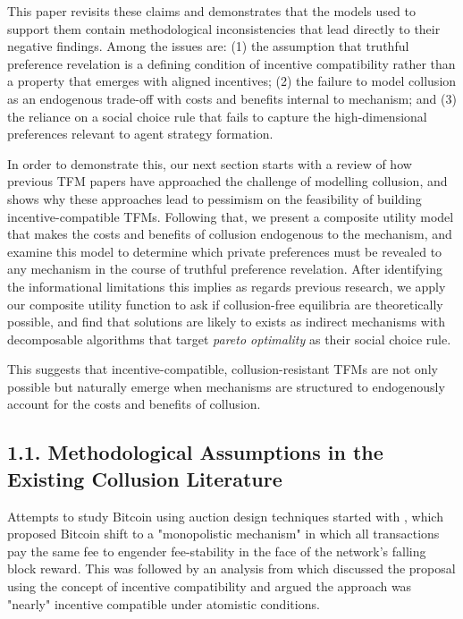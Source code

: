 \documentclass[oneside]{article}   	%
\begin{document}
This paper revisits these claims and demonstrates that the models used to support them contain methodological inconsistencies that lead directly to their negative findings. Among the issues are: (1) the assumption that truthful preference revelation is a defining condition of incentive compatibility rather than a property that emerges with aligned incentives; (2) the failure to model collusion as an endogenous trade-off with costs and benefits internal to mechanism; and (3) the reliance on a social choice rule that fails to capture the high-dimensional preferences relevant to agent strategy formation.

In order to demonstrate this, our next section starts with a review of how previous TFM papers have approached the challenge of modelling collusion, and shows why these approaches lead to pessimism on the feasibility of building incentive-compatible TFMs. Following that, we present a composite utility model that makes the costs and benefits of collusion endogenous to the mechanism, and examine this model to determine which private preferences must be revealed to any mechanism in the course of truthful preference revelation. After identifying the informational limitations this implies as regards previous research, we apply our composite utility function to ask if collusion-free equilibria are theoretically possible, and find that solutions are likely to exists as indirect mechanisms with decomposable algorithms that target \textit{pareto optimality} as their social choice rule.

This suggests that incentive-compatible, collusion-resistant TFMs are not only possible but naturally emerge when mechanisms are structured to endogenously account for the costs and benefits of collusion.


\subsection*{1.1. Methodological Assumptions in the Existing Collusion Literature}

Attempts to study Bitcoin using auction design techniques started with \cite{Lavi2017RedesigningBitcoin}, which proposed Bitcoin shift to a "monopolistic mechanism" in which all transactions pay the same fee to engender fee-stability in the face of the network's falling block reward. This was followed by an analysis from \cite{Yao2018IncentiveBitcoin} which discussed the proposal using the concept of incentive compatibility and argued the approach was "nearly" incentive compatible under atomistic conditions.
\end{document}
